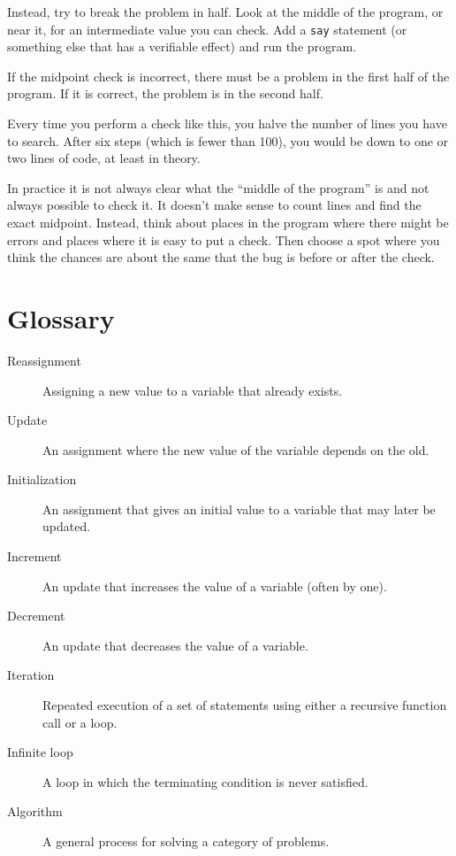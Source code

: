 Instead, try to break the problem in half.  Look at the middle
of the program, or near it, for an intermediate value you
can check.  Add a {\tt say} statement (or something else
that has a verifiable effect) and run the program.

If the midpoint check is incorrect, there must be a problem in the
first half of the program.  If it is correct, the problem is
in the second half.

Every time you perform a check like this, you halve the number of
lines you have to search.  After six steps (which is fewer than 100),
you would be down to one or two lines of code, at least in theory.

In practice it is not always clear what
the ``middle of the program'' is and not always possible to
check it.  It doesn't make sense to count lines and find the
exact midpoint.  Instead, think about places
in the program where there might be errors and places where it
is easy to put a check.  Then choose a spot where you
think the chances are about the same that the bug is before
or after the check.


\section{Glossary}

\begin{description}

\item[Reassignment] Assigning a new value to a variable that
already exists.

\item[Update] An assignment where the new value of the variable
depends on the old.

\item[Initialization] An assignment that gives an initial value to
a variable that may later be updated.

\item[Increment] An update that increases the value of a variable
(often by one).

\item[Decrement] An update that decreases the value of a variable.

\item[Iteration] Repeated execution of a set of statements using
either a recursive function call or a loop.

\item[Infinite loop] A loop in which the terminating condition is
never satisfied.

\item[Algorithm]  A general process for solving a category of
problems.

\end{description}


